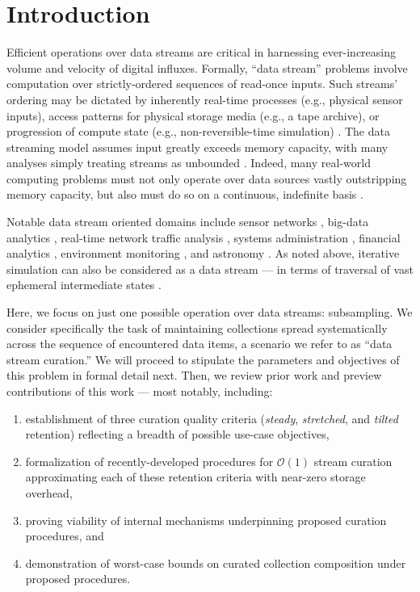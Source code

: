 \section{Introduction} \label{sec:introduction}

Efficient operations over data streams are critical in harnessing ever-increasing volume and velocity of digital influxes.
Formally, ``data stream'' problems involve computation over strictly-ordered sequences of read-once inputs.
Such streams' ordering may be dictated by inherently real-time processes (e.g., physical sensor inputs), access patterns for physical storage media (e.g., a tape archive), or progression of compute state (e.g., non-reversible-time simulation) \citep{henzinger1998computing}.
The data streaming model assumes input greatly exceeds memory capacity, with many analyses simply treating streams as unbounded \citep{jiang2006research}.
Indeed, many real-world computing problems must not only operate over data sources vastly outstripping memory capacity, but also must do so on a continuous, indefinite basis \citep{cordeiro2016online}.

Notable data stream oriented domains include sensor networks \citep{elnahrawy2003research}, big-data analytics \citep{he2010comet}, real-time network traffic analysis \citep{johnson2005streams,muthukrishnan2005data}, systems administration \citep{fischer2012real}, financial analytics \citep{rajeshwari2016real,agarwal2009faster}, environment monitoring \citep{hill2009real}, and astronomy \citep{graham2012data}.
As noted above, iterative simulation can also be considered as a data stream --- in terms of traversal of vast ephemeral intermediate states \citep{abdulla2004simulation,schutzel2014stream}.

Here, we focus on just one possible operation over data streams: subsampling.
We consider specifically the task of maintaining collections spread systematically across the sequence of encountered data items, a scenario we refer to as ``data stream curation.''
We will proceed to stipulate the parameters and objectives of this problem in formal detail next.
Then, we review prior work and preview contributions of this work --- most notably, including:
\begin{enumerate}
\item establishment of three curation quality criteria (\textit{steady}, \textit{stretched}, and \textit{tilted} retention) reflecting a breadth of possible use-case objectives,
\item formalization of recently-developed procedures for $\mathcal{O}(1)$ stream curation approximating each of these retention criteria with near-zero storage overhead,
\item proving viability of internal mechanisms underpinning proposed curation procedures, and
\item demonstration of worst-case bounds on curated collection composition under proposed procedures.
\end{enumerate}





